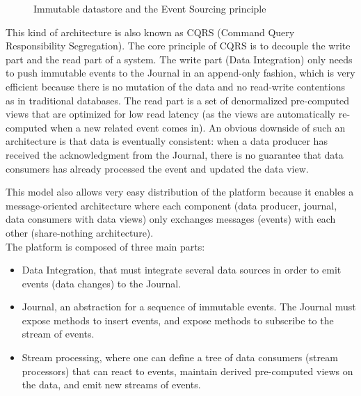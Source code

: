 \begin{figure}[h]
  \begin{center}
    \caption{Immutable datastore and the Event Sourcing principle}
    \label{fig:event-sourcing}
  \end{center}
\end{figure}

This kind of architecture is also known as CQRS  (Command Query Responsibility Segregation). The core principle of CQRS is to decouple the write part and the read part
of a system. The write part (Data Integration) only needs to push immutable events to the Journal in an append-only fashion, which
is very efficient because there is no mutation of the data and no read-write contentions as in traditional databases.
The read part is a set of denormalized pre-computed views that are optimized for low read latency (as the views are automatically re-computed
when a new related event comes in).
An obvious downside of such an architecture is that data is eventually consistent: when a data producer has received the acknowledgment
from the Journal, there is no guarantee that data consumers has already processed the event and updated the data view.

This model also allows very easy distribution of the platform because it enables a message-oriented
architecture where each component (data producer, journal, data consumers with data views) only exchanges messages (events) with each other (share-nothing architecture).
\\

The platform is composed of three main parts: 
\begin{itemize}
  \item Data Integration, that must integrate several data sources in order to emit 
events (data changes) to the Journal. 
  \item Journal, an abstraction for a sequence of immutable events. The Journal must expose methods to insert events,
  and expose methods to subscribe to the stream of events.
  \item Stream processing, where one can define a tree of data consumers (stream processors) that can react to
  events, maintain derived pre-computed views on the data, and emit new streams of events.
\end{itemize}


